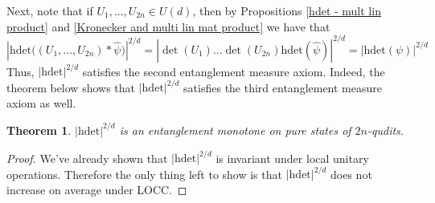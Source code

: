 \documentclass{article}
\newtheorem{theorem}{Theorem}
\begin{document}
Next, note that if $U_1,...,U_{2n} \in U(d)$, then by Propositions \ref{hdet - mult lin product} and \ref{Kronecker and multi lin mat product} we have that
\[\left|\mathrm{hdet}\big((U_1,...,U_{2n})*\widehat{\psi}\big)\right|^{2/d} = \left|\det(U_1)...\det(U_{2n})\mathrm{hdet}(\widehat{\psi})\right|^{2/d} = |\mathrm{hdet}(\psi)|^{2/d}\]
Thus, $|\mathrm{hdet}|^{2/d}$ satisfies the second entanglement measure axiom. Indeed, the theorem below shows that $|\mathrm{hdet}|^{2/d}$ satisfies the third entanglement measure axiom as well. 
\begin{theorem}\label{hdet is an entanglement monotone on 2n-qubits}
    $|\mathrm{hdet}|^{2/d}$ is an entanglement monotone on pure states of $2n$-qudits. 
\end{theorem}
\begin{proof}
    We've already shown that $|\mathrm{hdet}|^{2/d}$ is invariant under local unitary operations. Therefore the only thing left to show is that $|\mathrm{hdet}|^{2/d}$ does not increase on average under LOCC. 
    

\end{proof}
\end{document}

